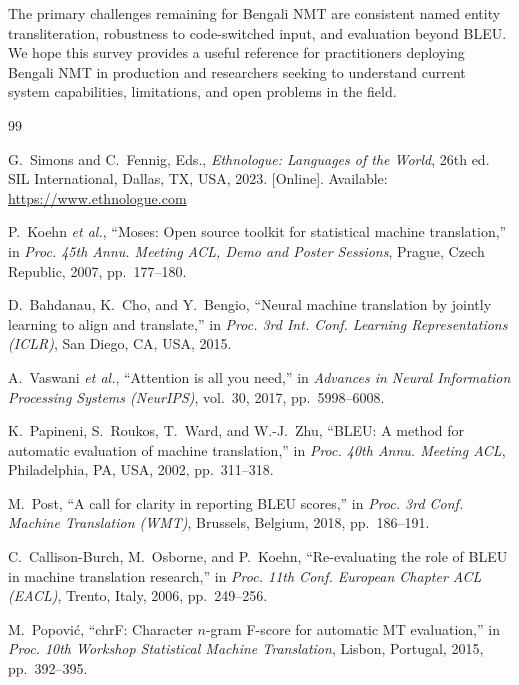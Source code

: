\documentclass[conference]{IEEEtran}
\begin{document}
The primary challenges remaining for Bengali NMT are consistent named
entity transliteration, robustness to code-switched input, and evaluation
beyond BLEU.
We hope this survey provides a useful reference for practitioners deploying
Bengali NMT in production and researchers seeking to understand current
system capabilities, limitations, and open problems in the field.



\begin{thebibliography}{99}

G.~Simons and C.~Fennig, Eds.,
\emph{Ethnologue: Languages of the World}, 26th ed.
SIL International, Dallas, TX, USA, 2023. [Online].
Available: \url{https://www.ethnologue.com}

P.~Koehn \textit{et al.},
``Moses: Open source toolkit for statistical machine translation,''
in \emph{Proc. 45th Annu. Meeting ACL, Demo and Poster Sessions},
Prague, Czech Republic, 2007, pp.~177--180.

D.~Bahdanau, K.~Cho, and Y.~Bengio,
``Neural machine translation by jointly learning to align and translate,''
in \emph{Proc. 3rd Int. Conf. Learning Representations (ICLR)},
San Diego, CA, USA, 2015.

A.~Vaswani \textit{et al.},
``Attention is all you need,''
in \emph{Advances in Neural Information Processing Systems (NeurIPS)},
vol.~30, 2017, pp.~5998--6008.

K.~Papineni, S.~Roukos, T.~Ward, and W.-J.~Zhu,
``BLEU: A method for automatic evaluation of machine translation,''
in \emph{Proc. 40th Annu. Meeting ACL},
Philadelphia, PA, USA, 2002, pp.~311--318.

M.~Post,
``A call for clarity in reporting BLEU scores,''
in \emph{Proc. 3rd Conf. Machine Translation (WMT)},
Brussels, Belgium, 2018, pp.~186--191.

C.~Callison-Burch, M.~Osborne, and P.~Koehn,
``Re-evaluating the role of BLEU in machine translation research,''
in \emph{Proc. 11th Conf. European Chapter ACL (EACL)},
Trento, Italy, 2006, pp.~249--256.

M.~Popovi\'{c},
``chrF: Character $n$-gram F-score for automatic MT evaluation,''
in \emph{Proc. 10th Workshop Statistical Machine Translation},
Lisbon, Portugal, 2015, pp.~392--395.


\end{thebibliography}
\end{document}
